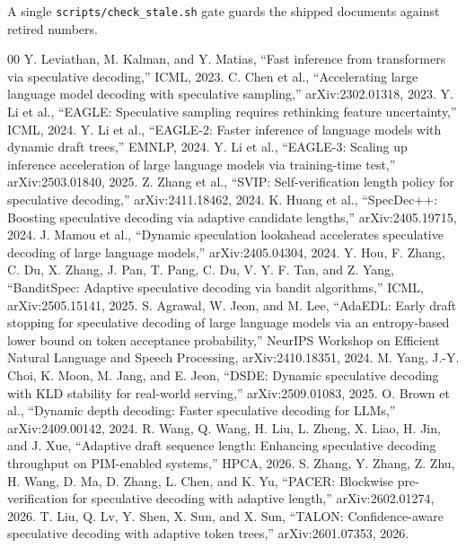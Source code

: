 \documentclass[conference]{IEEEtran}
\begin{document}
\noindent A single \texttt{scripts/check\_stale.sh} gate guards the shipped documents against
retired numbers.

\begin{thebibliography}{00}
 Y. Leviathan, M. Kalman, and Y. Matias, ``Fast inference from transformers via speculative decoding,'' ICML, 2023.
 C. Chen et al., ``Accelerating large language model decoding with speculative sampling,'' arXiv:2302.01318, 2023.
 Y. Li et al., ``EAGLE: Speculative sampling requires rethinking feature uncertainty,'' ICML, 2024.
 Y. Li et al., ``EAGLE-2: Faster inference of language models with dynamic draft trees,'' EMNLP, 2024.
 Y. Li et al., ``EAGLE-3: Scaling up inference acceleration of large language models via training-time test,'' arXiv:2503.01840, 2025.
 Z. Zhang et al., ``SVIP: Self-verification length policy for speculative decoding,'' arXiv:2411.18462, 2024.
 K. Huang et al., ``SpecDec++: Boosting speculative decoding via adaptive candidate lengths,'' arXiv:2405.19715, 2024.
 J. Mamou et al., ``Dynamic speculation lookahead accelerates speculative decoding of large language models,'' arXiv:2405.04304, 2024.
 Y. Hou, F. Zhang, C. Du, X. Zhang, J. Pan, T. Pang, C. Du, V. Y. F. Tan, and Z. Yang, ``BanditSpec: Adaptive speculative decoding via bandit algorithms,'' ICML, arXiv:2505.15141, 2025.
 S. Agrawal, W. Jeon, and M. Lee, ``AdaEDL: Early draft stopping for speculative decoding of large language models via an entropy-based lower bound on token acceptance probability,'' NeurIPS Workshop on Efficient Natural Language and Speech Processing, arXiv:2410.18351, 2024.
 M. Yang, J.-Y. Choi, K. Moon, M. Jang, and E. Jeon, ``DSDE: Dynamic speculative decoding with KLD stability for real-world serving,'' arXiv:2509.01083, 2025.
 O. Brown et al., ``Dynamic depth decoding: Faster speculative decoding for LLMs,'' arXiv:2409.00142, 2024.
 R. Wang, Q. Wang, H. Liu, L. Zheng, X. Liao, H. Jin, and J. Xue, ``Adaptive draft sequence length: Enhancing speculative decoding throughput on PIM-enabled systems,'' HPCA, 2026.
 S. Zhang, Y. Zhang, Z. Zhu, H. Wang, D. Ma, D. Zhang, L. Chen, and K. Yu, ``PACER: Blockwise pre-verification for speculative decoding with adaptive length,'' arXiv:2602.01274, 2026.
 T. Liu, Q. Lv, Y. Shen, X. Sun, and X. Sun, ``TALON: Confidence-aware speculative decoding with adaptive token trees,'' arXiv:2601.07353, 2026.

\end{thebibliography}
\end{document}
